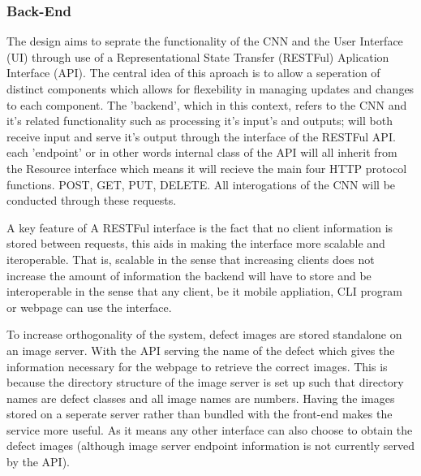     \subsubsection{Back-End}
      The design aims to seprate the functionality of the CNN and the User Interface (UI) through use of a Representational State Transfer (RESTFul) Aplication Interface (API). The central idea of this aproach is to allow a seperation of distinct components which allows for flexebility in managing updates and changes to each component. The 'backend', which in this context, refers to the CNN and it's related functionality such as processing it's input's and outputs; will both receive input and serve it's output through the interface of the RESTFul API. each 'endpoint' or in other words internal class of the API will all inherit from the Resource interface which means it will recieve the main four HTTP protocol functions. POST, GET, PUT, DELETE. All interogations of the CNN will be conducted through these requests.
      \par
      A key feature of A RESTFul interface is the fact that no client information is stored
      between requests, this aids in making the interface more scalable and iteroperable. That is, scalable in the sense that increasing clients does not increase the amount of information the backend will have to store and be interoperable in the sense that any client, be it mobile appliation, CLI program or webpage can use the interface.
      \par
      To increase orthogonality of the system, defect images are stored standalone on an image server. With the API serving the name of the defect which gives the information necessary for the webpage to retrieve the correct images. This is because the directory structure of the image server is set up such that directory names are defect classes and all image names are numbers. Having the images stored on a seperate server rather than bundled with the front-end makes the service more useful. As it means any other interface can also choose to obtain the defect images (although image server endpoint information is not currently served by the API).

